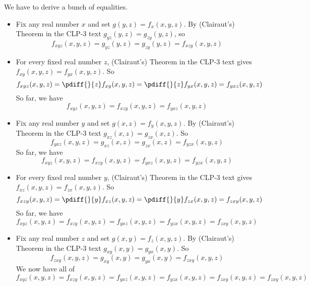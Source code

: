 \begin{solution}
We have to derive a bunch of equalities.
\begin{itemize}
\item
Fix any real number $x$ and set $g(y,z)=f_x(x,y,z)$. By 
(Clairaut's) Theorem  in the CLP-3 text
$g_{yz}(y,z)=g_{zy}(y,z)$, so
\begin{equation*}
f_{xyz}(x,y,z) = g_{yz}(y,z) =g_{zy}(y,z) = f_{xzy}(x,y,z)
\end{equation*}
\item
For every fixed real number $z$, 
(Clairaut's) Theorem  in the CLP-3 text
gives $f_{xy}(x,y,z)=f_{yx}(x,y,z)$. So
\begin{equation*}
f_{xyz}(x,y,z) = \pdiff{}{z} f_{xy}(x,y,z)= \pdiff{}{z} f_{yx}(x,y,z)
=f_{yxz}(x,y,z)
\end{equation*}
So far, we have
\begin{equation*}
f_{xyz}(x,y,z) = f_{xzy}(x,y,z)=f_{yxz}(x,y,z)
\end{equation*}
\item
Fix any real number $y$ and set $g(x,z)=f_y(x,y,z)$. By 
(Clairaut's) Theorem  in the CLP-3 text
$g_{xz}(x,z)=g_{zx}(x,z)$. So
\begin{equation*}
f_{yxz}(x,y,z) = g_{xz}(x,z) =g_{zx}(x,z) = f_{yzx}(x,y,z)
\end{equation*}
So far, we have
\begin{equation*}
f_{xyz}(x,y,z) = f_{xzy}(x,y,z)=f_{yxz}(x,y,z)= f_{yzx}(x,y,z)
\end{equation*}
\item
For every fixed real number $y$, 
(Clairaut's) Theorem  in the CLP-3 text
gives $f_{xz}(x,y,z)=f_{zx}(x,y,z)$. So
\begin{equation*}
f_{xzy}(x,y,z) = \pdiff{}{y} f_{xz}(x,y,z)= \pdiff{}{y} f_{zx}(x,y,z)
=f_{zxy}(x,y,z)
\end{equation*}
So far, we have
\begin{equation*}
f_{xyz}(x,y,z) = f_{xzy}(x,y,z)=f_{yxz}(x,y,z)= f_{yzx}(x,y,z)=f_{zxy}(x,y,z)
\end{equation*}
\item
Fix any real number $z$ and set $g(x,y)=f_z(x,y,z)$. By 
(Clairaut's) Theorem  in the CLP-3 text
$g_{xy}(x,y)=g_{yx}(x,y)$. So
\begin{equation*}
f_{zxy}(x,y,z) = g_{xy}(x,y) =g_{yx}(x,y) = f_{zxy}(x,y,z)
\end{equation*}
We now have all of 
\begin{equation*}
f_{xyz}(x,y,z) = f_{xzy}(x,y,z)=f_{yxz}(x,y,z)= f_{yzx}(x,y,z)=f_{zxy}(x,y,z)
= f_{zxy}(x,y,z)
\end{equation*}
\end{itemize}
\end{solution}

